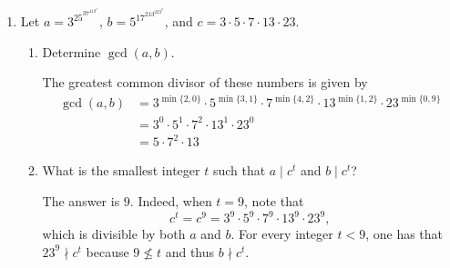 \documentclass[11pt]{article}
\begin{document}
\begin{enumerate}
\item Let $a =3^25^37^413^1$, $b=5^17^213^223^9$, and $c=3\cdot 5\cdot 7\cdot 13\cdot 23$. \begin{enumerate}
       \item Determine $\gcd(a,b)$.
       
       \begin{Solution}
        The greatest common divisor of these numbers is given by
        \begin{align*}
         \gcd(a,b) & = 3^{\min\{2,0\}}\cdot 5^{\min\{3,1\}}\cdot 7^{\min\{4,2\}}\cdot 13^{\min\{1,2\}}\cdot 23^{\min\{0,9\}}\\
         & = 3^0\cdot 5^1\cdot 7^2\cdot 13^1\cdot 23^0\\
         & = 5\cdot 7^2\cdot 13
        \end{align*}

       \end{Solution}

       \item What is the smallest integer $t$ such that $a\mid c^t$ and $b\mid c^t$?
              \begin{Solution}
        The answer is $9$. Indeed, when $t=9$, note that 
        \[c^t = c^9 = 3^9\cdot 5^9\cdot 7^9\cdot 13^9\cdot 23^9,\] which is divisible by both $a$ and $b$. For every integer $t<9$, one has that $23^9\nmid c^t$ because $9\not\leq t$ and thus $b\nmid c^t$.
       \end{Solution}

      \end{enumerate}




\end{enumerate}
\end{document}
